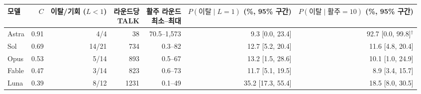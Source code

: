 \begin{tabular}{lrrrrrr}
\toprule
모델 & $C$ & \shortstack{이탈/기회\\($L<1$)} & \shortstack{라운드당\\TALK} & \shortstack{활주 라운드\\최소--최대} & \shortstack{$P(\text{이탈}\mid L=1)$\\(\%, 95\% 구간)} & \shortstack{$P(\text{이탈}\mid \text{활주}=10)$\\(\%, 95\% 구간)} \\
\midrule
Astra & 0.91 & 4/4 & 38 & 70.5--1,573 & 9.3 [0.0, 23.4] & 92.7 [0.0, 99.8]$^{\dagger}$ \\
Sol & 0.69 & 14/21 & 734 & 0.3--82 & 12.7 [5.2, 20.4] & 11.6 [4.8, 20.4] \\
Opus & 0.53 & 5/14 & 893 & 0.5--67 & 13.2 [1.5, 28.6] & 10.1 [1.0, 24.9] \\
Fable & 0.47 & 3/14 & 823 & 0.6--73 & 11.7 [5.1, 19.5] & 8.9 [3.4, 15.7] \\
Luna & 0.39 & 8/12 & 1231 & 0.1--49 & 35.2 [17.3, 55.4] & 18.5 [8.0, 30.5] \\
\bottomrule
\end{tabular}
